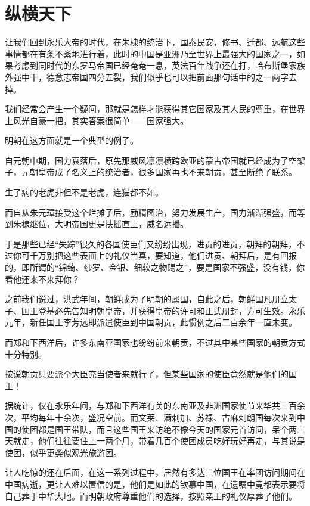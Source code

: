 \section{纵横天下}
\ifnum{}
	\begin{multicols}{\theparacolNo}
\fi
让我们回到永乐大帝的时代，在朱棣的统治下，国泰民安，修书、迁都、远航这些事情都在有条不紊地进行着，此时的中国是亚洲乃至世界上最强大的国家之一，如果考虑到同时代的东罗马帝国已经奄奄一息，英法百年战争还在打，哈布斯堡家族外强中干，德意志帝国四分五裂，我们似乎也可以把前面那句话中的之一两字去掉。

我们经常会产生一个疑问，那就是怎样才能获得其它国家及其人民的尊重，在世界上风光自豪一把，其实答案很简单——国家强大。

明朝在这方面就是一个典型的例子。

自元朝中期，国力衰落后，原先那威风凛凛横跨欧亚的蒙古帝国就已经成为了空架子，元朝皇帝成了名义上的统治者，很多国家再也不来朝贡，甚至断绝了联系。

生了病的老虎非但不是老虎，连猫都不如。

而自从朱元璋接受这个烂摊子后，励精图治，努力发展生产，国力渐渐强盛，而等到朱棣继位，大明帝国更是扶摇直上，威名远播。

于是那些已经“失踪”很久的各国使臣们又纷纷出现，进贡的进贡，朝拜的朝拜，不过你可千万别把这些表面上的礼仪当真，要知道，他们进贡、朝拜后，是有回报的，即所谓的“锦绮、纱罗、金银、细软之物赐之”，要是国家不强盛，没有钱，你看他还来不来拜你？

之前我们说过，洪武年间，朝鲜成为了明朝的属国，自此之后，朝鲜国凡册立太子、国王登基必先告知明朝皇帝，并获得皇帝的许可和正式册封，方可生效。永乐元年，新任国王李芳远即派遣使臣到中国朝贡，此惯例之后二百余年一直未变。

而郑和下西洋后，许多东南亚国家也纷纷前来朝贡，不过其中某些国家的朝贡方式十分特别。

按说朝贡只要派个大臣充当使者来就行了，但某些国家的使臣竟然就是他们的国王！

据统计，仅在永乐年间，与郑和下西洋有关的东南亚及非洲国家使节来华共三百余次，平均每年十余次，盛况空前。而文莱、满剌加、苏禄、古麻剌朗国每次来到中国的使团都是国王带队，而且这些国王来访绝不像今天的国家元首访问，呆个两三天就走，他们往往要住上一两个月，带着几百个使团成员吃好玩好再走，与其说是使团，似乎更类似观光旅游团。

让人吃惊的还在后面，在这一系列过程中，居然有多达三位国王在率团访问期间在中国病逝，更让人难以置信的是，他们是如此的钦慕中国，在遗嘱中竟都表示要将自己葬于中华大地。而明朝政府尊重他们的选择，按照亲王的礼仪厚葬了他们。


\end{multicols}
